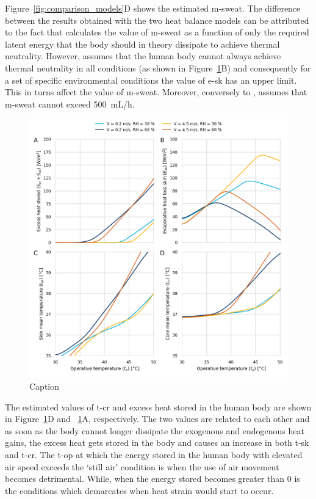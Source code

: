 Figure~\ref{fig:comparison_models}D shows the estimated \ac{m-sweat}.
The difference between the results obtained with the two heat balance models can be attributed to the fact that \citeauthor{Jay2015} calculates the value of \ac{m-sweat} as a function of only the required latent energy that the body should in theory dissipate to achieve thermal neutrality.
However, \citeauthor{GaggeSET} assumes that the human body cannot always achieve thermal neutrality in all conditions (as shown in Figure~\ref{fig:results_model_2}B) and consequently for a set of specific environmental conditions the value of \ac{e-sk} has an upper limit.
This in turns affect the value of \ac{m-sweat}.
Moreover, conversely to \citeauthor{Jay2015}, \citeauthor{GaggeSET} assumes that \ac{m-sweat} cannot exceed 500~mL/h.

\begin{figure}[b!]
    \centering
    \includegraphics[width=\textwidth]{figures/results_model_2.png}
    \caption{Caption}
    \label{fig:results_model_2}
\end{figure}

The estimated values of \ac{t-cr} and excess heat stored in the human body are shown in Figure~\ref{fig:results_model_2}D and ~\ref{fig:results_model_2}A, respectively.
The two values are related to each other and as soon as the body cannot longer dissipate the exogenous and endogenous heat gains, the excess heat gets stored in the body and causes an increase in both \ac{t-sk} and \ac{t-cr}.
The \ac{t-op} at which the energy stored in the human body with elevated air speed exceeds the `still air' condition is when the use of air movement becomes detrimental.
While, when the energy stored becomes greater than 0 is the conditions which demarcates when heat strain would start to occur.

